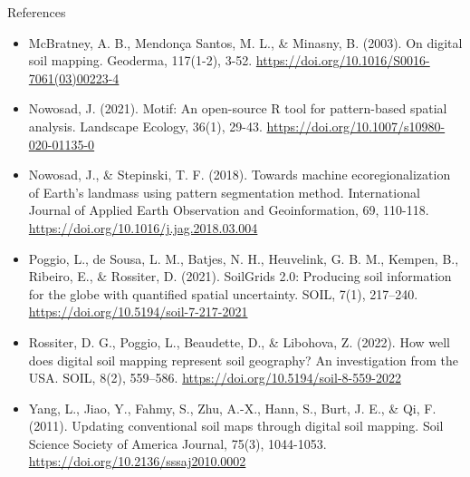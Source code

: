 \documentclass[aspectratio=169, 10pt]{beamer}
\begin{document}
\begin{frame}[allowframebreaks]{References}
\begin{scriptsize}
\begin{itemize}
    \item McBratney, A. B., Mendon\c{c}a Santos, M. L., \& Minasny, B. (2003). On digital soil mapping. Geoderma, 117(1-2), 3-52. \url{https://doi.org/10.1016/S0016-7061(03)00223-4}

    \item Nowosad, J. (2021). Motif: An open-source R tool for pattern-based spatial analysis. Landscape Ecology, 36(1), 29-43. \url{https://doi.org/10.1007/s10980-020-01135-0}

    
    \item Nowosad, J., \& Stepinski, T. F. (2018). Towards machine ecoregionalization of Earth’s landmass using pattern segmentation method. International Journal of Applied Earth Observation and Geoinformation, 69, 110-118. \url{https://doi.org/10.1016/j.jag.2018.03.004}

    \item Poggio, L., de Sousa, L. M., Batjes, N. H., Heuvelink, G. B. M., Kempen, B., Ribeiro, E., \& Rossiter, D. (2021). SoilGrids 2.0: Producing soil information for the globe with quantified spatial uncertainty. SOIL, 7(1), 217--240. \url{https://doi.org/10.5194/soil-7-217-2021}



    \item Rossiter, D. G., Poggio, L., Beaudette, D., \& Libohova, Z. (2022). How well does digital soil mapping represent soil geography? An investigation from the USA. SOIL, 8(2), 559--586. \url{https://doi.org/10.5194/soil-8-559-2022}


      \item Yang, L., Jiao, Y., Fahmy, S., Zhu, A.-X., Hann, S., Burt, J. E., \& Qi, F. (2011). Updating conventional soil maps through digital soil mapping. Soil Science Society of America Journal, 75(3), 1044-1053. \url{https://doi.org/10.2136/sssaj2010.0002}

    \end{itemize}
  \end{scriptsize}
\end{frame}

\end{document}
